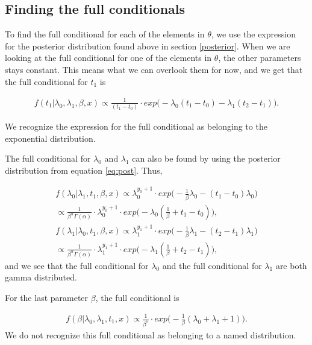 \subsection{Finding the full conditionals} \label{full_cond}

To find the full conditional for each of the elements in $\theta$, we use the expression for the posterior distribution found above in section \ref{posterior}. When we are looking at the full conditional for one of the elements in $\theta$, the other parameters stays constant. This means what we can overlook them for now, and we get that the full conditional for $t_1$ is

\begin{align}
    f(t_1 | \lambda_0, \lambda_1, \beta, x) \propto 
    \frac{1}{(t_1 - t_0)} \cdot exp \Big( -\lambda_0(t_1 - t_0) - \lambda_1 (t_2 - t_1) \Big).
\end{align}

We recognize the expression for the full conditional as belonging to the exponential distribution. 

The full conditional for $\lambda_0$ and $\lambda_1$ can also be found by using the posterior distribution from equation \ref{eq:post}. Thus, 

\begin{align}
    f(\lambda_0 | \lambda_1, t_1, \beta, x) \propto
    \lambda_0^{y_0 + 1}\cdot exp \Big( -\frac{1}{\beta} \lambda_0 - (t_1 - t_0)\lambda_0 \Big) 
    \nonumber \\
    \propto \frac{1}{\beta^{\alpha} \Gamma(\alpha)}\cdot \lambda_0^{y_0 + 1} \cdot exp \Big( - \lambda_0 (\frac{1}{\beta} + t_1 - t_0) \Big),
     \\
    f(\lambda_1 | \lambda_0, t_1, \beta, x) \propto
    \lambda_1^{y_1 + 1}\cdot exp \Big( -\frac{1}{\beta} \lambda_1 - (t_2 - t_1)\lambda_1 \Big) \nonumber \\
    \propto \frac{1}{\beta^{\alpha} \Gamma(\alpha)}\cdot \lambda_1^{y_1 + 1} \cdot exp \Big( - \lambda_1 (\frac{1}{\beta} + t_2 - t_1) \Big),
\end{align}
and we see that the full conditional for $\lambda_0$ and the full conditional for $\lambda_1$ are both gamma distributed. 

For the last parameter $\beta$, the full conditional is

\begin{align}
    f(\beta | \lambda_0, \lambda_1, t_1, x) \propto 
    \frac{1}{\beta^5} \cdot exp \Big( -\frac{1}{\beta}(\lambda_0 + \lambda_1 + 1) \Big).
\end{align}
We do not recognize this full conditional as belonging to a named distribution. 

